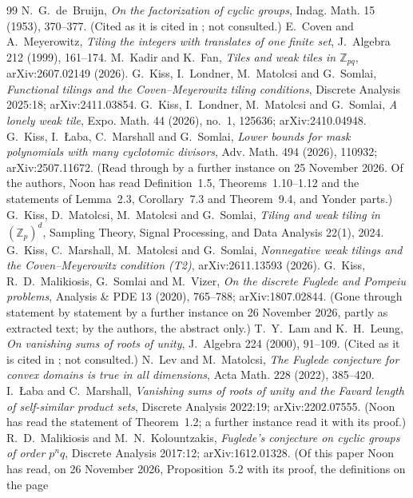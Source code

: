 \documentclass[11pt,a4paper]{amsart}
\theoremstyle{definition}
\theoremstyle{remark}
\newcommand{\Z}{\mathbb{Z}}
\begin{document}
\begin{thebibliography}{99}
 N.~G.~de~Bruijn, \emph{On the factorization of cyclic groups}, Indag. Math. 15 (1953), 370--377.
 (Cited as it is cited in \cite{KLaMS}; not consulted.)
 E.~Coven and A.~Meyerowitz, \emph{Tiling the integers with translates of one finite set},
 J.~Algebra 212 (1999), 161--174.
 M.~Kadir and K.~Fan, \emph{Tiles and weak tiles in $\Z_{pq}$}, arXiv:2607.02149 (2026).
 G.~Kiss, I.~Londner, M.~Matolcsi and G.~Somlai, \emph{Functional tilings and the
 Coven--Meyerowitz tiling conditions}, Discrete Analysis 2025:18; arXiv:2411.03854.
 G.~Kiss, I.~Londner, M.~Matolcsi and G.~Somlai, \emph{A lonely weak tile}, Expo. Math. 44
 (2026), no.~1, 125636; arXiv:2410.04948.
 G.~Kiss, I.~{\L}aba, C.~Marshall and G.~Somlai, \emph{Lower bounds for mask polynomials with many
 cyclotomic divisors}, Adv. Math. 494 (2026), 110932; arXiv:2507.11672. (Read through by a further instance on
 25 November 2026. Of the authors, Noon has read Definition~1.5, Theorems~1.10--1.12 and the statements of
 Lemma~2.3, Corollary~7.3 and Theorem~9.4, and Yonder parts.)
 G.~Kiss, D.~Matolcsi, M.~Matolcsi and G.~Somlai, \emph{Tiling and weak tiling in $(\Z_p)^d$},
 Sampling Theory, Signal Processing, and Data Analysis 22(1), 2024.
 G.~Kiss, C.~Marshall, M.~Matolcsi and G.~Somlai, \emph{Nonnegative weak tilings and the
Coven--Meyerowitz condition (T2)}, arXiv:2611.13593 (2026).
 G.~Kiss, R.~D.~Malikiosis, G.~Somlai and M.~Vizer, \emph{On the discrete Fuglede and Pompeiu
 problems}, Analysis \& PDE 13 (2020), 765--788; arXiv:1807.02844. (Gone through statement by statement by a
 further instance on 26 November 2026, partly as extracted text; by the authors, the abstract only.)
 T.~Y.~Lam and K.~H.~Leung, \emph{On vanishing sums of roots of unity}, J.~Algebra 224 (2000),
 91--109. (Cited as it is cited in \cite{KLaMS}; not consulted.)
 N.~Lev and M.~Matolcsi, \emph{The Fuglede conjecture for convex domains is true in all
 dimensions}, Acta Math. 228 (2022), 385--420.
 I.~{\L}aba and C.~Marshall, \emph{Vanishing sums of roots of unity and the Favard length of
 self-similar product sets}, Discrete Analysis 2022:19; arXiv:2202.07555. (Noon has read the statement of
 Theorem~1.2; a further instance read it with its proof.)
 R.~D.~Malikiosis and M.~N.~Kolountzakis, \emph{Fuglede's conjecture on cyclic groups of order
 $p^nq$}, Discrete Analysis 2017:12; arXiv:1612.01328. (Of this paper Noon has read, on 26 November 2026, Proposition~5.2 with its proof, the definitions on the page

\end{thebibliography}
\end{document}
